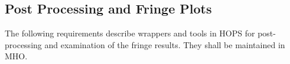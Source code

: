 \begin{description}


%

\end{description}



\subsection{Post Processing and Fringe Plots}
\label{sec:postprocreq}

The following requirements describe wrappers and tools in HOPS for
post-processing and examination of the fringe results. They shall be
maintained in MHO.


